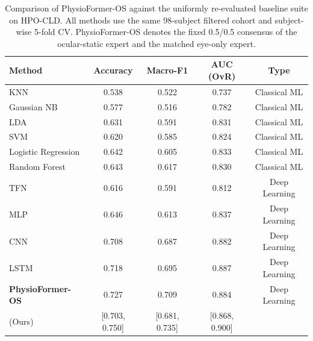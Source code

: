 \begin{table}[htbp]
\centering
\caption{Comparison of PhysioFormer-OS against the uniformly re-evaluated baseline suite on HPO-CLD. All methods use the same 98-subject filtered cohort and subject-wise 5-fold CV. PhysioFormer-OS denotes the fixed 0.5/0.5 consensus of the ocular-static expert and the matched eye-only expert.}
\label{tab:main_results}
\begin{tabular}{lcccc}
\toprule
Method & Accuracy & Macro-F1 & AUC (OvR) & Type \\
\midrule
KNN & 0.538 & 0.522 & 0.737 & Classical ML \\
Gaussian NB & 0.577 & 0.516 & 0.782 & Classical ML \\
LDA & 0.631 & 0.591 & 0.831 & Classical ML \\
SVM & 0.620 & 0.585 & 0.824 & Classical ML \\
Logistic Regression & 0.642 & 0.605 & 0.833 & Classical ML \\
Random Forest & 0.643 & 0.617 & 0.830 & Classical ML \\
TFN & 0.616 & 0.591 & 0.812 & Deep Learning \\
MLP & 0.646 & 0.613 & 0.837 & Deep Learning \\
CNN & 0.708 & 0.687 & 0.882 & Deep Learning \\
LSTM & 0.718 & 0.695 & 0.887 & Deep Learning \\
\textbf{PhysioFormer-OS} & 0.727 & 0.709 & 0.884 & Deep Learning \\
(Ours) & [0.703, 0.750] & [0.681, 0.735] & [0.868, 0.900] &  \\
\bottomrule
\end{tabular}
\end{table}
